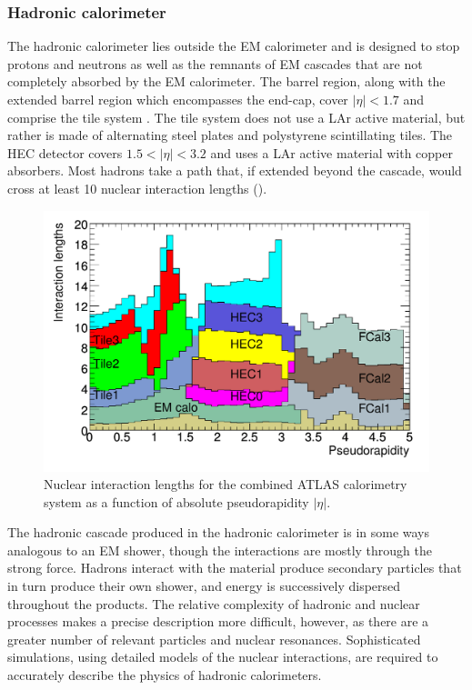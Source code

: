 
\subsubsection{Hadronic calorimeter}

The hadronic calorimeter lies outside the \ac{EM} calorimeter and is designed to stop protons and neutrons as well as the remnants of \ac{EM} cascades that are not completely absorbed by the \ac{EM} calorimeter.
The barrel region, along with the extended barrel region which encompasses the end-cap, cover $|\eta| < 1.7$ and comprise the tile system \cite{ATLAS:1996aa}.
The tile system does not use a \ac{LAr} active material, but rather is made of alternating steel plates and polystyrene scintillating tiles.
The \ac{HEC} detector covers $1.5 < |\eta| < 3.2$ and uses a \ac{LAr} active material with copper absorbers.
Most hadrons take a path that, if extended beyond the cascade, would cross at least 10 nuclear interaction lengths ().

\begin{figure}[t]
\includegraphics{calo_nuclear_int_length.pdf}
\caption{Nuclear interaction lengths for the combined ATLAS calorimetry system as a function of absolute pseudorapidity $|\eta|$.}
\label{fig:atlas_calo_nuclear_int_length}
\end{figure}

The hadronic cascade produced in the hadronic calorimeter is in some ways analogous to an \ac{EM} shower, though the interactions are mostly through the strong force.
Hadrons interact with the material produce secondary particles that in turn produce their own shower, and energy is successively dispersed throughout the products.
The relative complexity of hadronic and nuclear processes makes a precise description more difficult, however, as there are a greater number of relevant particles and nuclear resonances.
Sophisticated \mc simulations, using detailed models of the nuclear interactions, are required to accurately describe the physics of hadronic calorimeters.

